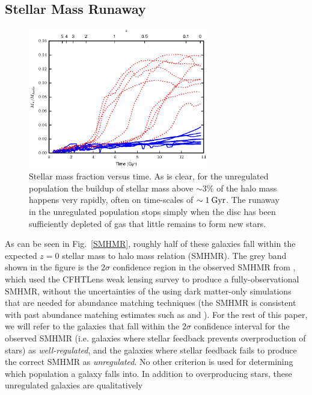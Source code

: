 \subsection{Stellar Mass Runaway}
\begin{figure}
    \includegraphics[width=0.7\textwidth]{figures3/stellar_fraction_time.eps}
    \caption[Stellar mass fraction evolution in MUGS2]{Stellar mass fraction
    versus time.  As is clear, for the unregulated population the buildup of
    stellar mass above $\sim3\%$ of the halo mass happens very rapidly, often on
    time-scales of $\sim1\>{\rm Gyr}$.  The runaway in the unregulated population stops
    simply when the disc has been sufficiently depleted of gas that little
    remains to form new stars.}
    \label{stellar_fraction_time}
\end{figure}
As can be seen in Fig.~\ref{SMHMR}, roughly half of these galaxies fall within
the expected $z=0$ stellar mass to halo mass relation (SMHMR).  The grey band
shown in the figure is the $2\sigma$ confidence region in the observed SMHMR
from \citet{Hudson2015}, which used the CFHTLens weak lensing survey to produce
a fully-observational SMHMR, without the uncertainties of the using dark
matter-only simulations that are needed for abundance matching techniques (the
\citet{Hudson2015} SMHMR is consistent with past abundance matching estimates
such as \citet{Behroozi2013} and \citet{Moster2013}).  For the rest of this
paper, we will refer to the galaxies that fall within the $2\sigma$ confidence
interval for the observed SMHMR (i.e. galaxies where stellar feedback prevents
overproduction of stars) as {\it well-regulated}, and the galaxies where stellar
feedback fails to produce the correct SMHMR as {\it unregulated}.  No other
criterion is used for determining which population a galaxy falls into. In
addition to overproducing stars, these unregulated galaxies are qualitatively
